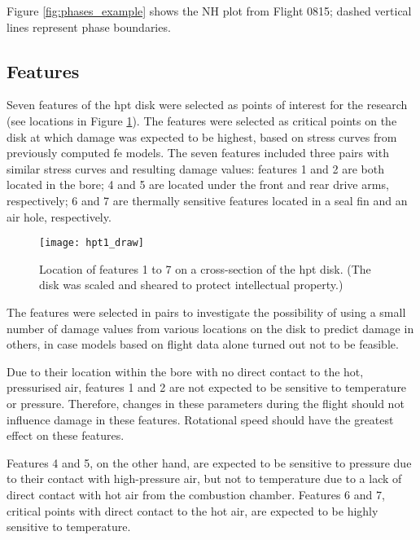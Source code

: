 Figure \ref{fig:phases_example} shows the NH plot from Flight 0815; dashed vertical lines represent phase boundaries.

\subsection{Features} \label{sec:features}
Seven features of the \ac{hpt} disk were selected as points of interest for the research (see locations in Figure \ref{fig:hpt1}). The features were selected as critical points on the disk at which damage was expected to be highest, based on stress curves from previously computed \ac{fe} models. The seven features included three pairs with similar stress curves and resulting damage values: features 1 and 2 are both located in the bore; 4 and 5 are located under the front and rear drive arms, respectively; 6 and 7 are thermally sensitive features located in a seal fin and an air hole, respectively.

\begin{figure}
    \centering
    \texttt{[image: hpt1\_draw]}
    \caption{\label{fig:hpt1} Location of features 1 to 7 on a cross-section of the \ac{hpt} disk. (The disk was scaled and sheared to protect intellectual property.)}
\end{figure}

The features were selected in pairs to investigate the possibility of using a small number of damage values from various locations on the disk to predict damage in others, in case models based on flight data alone turned out not to be feasible.

Due to their location within the bore with no direct contact to the hot, pressurised air, features 1 and 2 are not expected to be sensitive to temperature or pressure. Therefore, changes in these parameters during the flight should not influence damage in these features. Rotational speed should have the greatest effect on these features.

Features 4 and 5, on the other hand, are expected to be sensitive to pressure due to their contact with high-pressure air, but not to temperature due to a lack of direct contact with hot air from the combustion chamber. Features 6 and 7, critical points with direct contact to the hot air, are expected to be highly sensitive to temperature.

